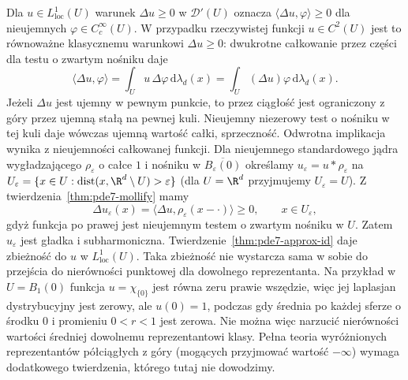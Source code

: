 \begin{uwaga}
Dla $u\in L^1_{\mathrm{loc}}(U)$ warunek
$\Delta u\ge0$ w $\mathcal D'(U)$ oznacza
$\langle\Delta u,\varphi\rangle\ge0$ dla nieujemnych
$\varphi\in C_c^\infty(U)$. W przypadku rzeczywistej
funkcji $u\in C^2(U)$ jest to równoważne klasycznemu
warunkowi $\Delta u\ge0$: dwukrotne całkowanie przez części
dla testu o zwartym nośniku daje
\[
 \langle\Delta u,\varphi\rangle
 =\int_U u\,\Delta\varphi\,\mathrm d\lambda_d(x)
 =\int_U (\Delta u)\varphi\,\mathrm d\lambda_d(x).
\]
Jeżeli $\Delta u$ jest ujemny w pewnym punkcie, to przez
ciągłość jest ograniczony z góry przez ujemną stałą na
pewnej kuli. Nieujemny niezerowy test o nośniku w tej
kuli daje wówczas ujemną wartość całki, sprzeczność.
Odwrotna implikacja wynika z nieujemności całkowanej
funkcji. Dla nieujemnego standardowego
jądra wygładzającego $\rho_\varepsilon$ o całce $1$
i nośniku w $\overline{B_\varepsilon(0)}$ określamy
$u_\varepsilon=u*\rho_\varepsilon$ na
$U_\varepsilon=\{x\in U:\operatorname{dist}(x,\R^d\setminus U)>
\varepsilon\}$ (dla $U=\R^d$ przyjmujemy $U_\varepsilon=U$).
Z twierdzenia~\ref{thm:pde7-mollify} mamy
\[
 \Delta u_\varepsilon(x)
 =\langle\Delta u,\rho_\varepsilon(x-\cdot)\rangle\ge0,
 \qquad x\in U_\varepsilon,
\]
gdyż funkcja po prawej jest nieujemnym testem o zwartym
nośniku w $U$. Zatem $u_\varepsilon$ jest gładka
i subharmoniczna. Twierdzenie~\ref{thm:pde7-approx-id}
daje zbieżność do $u$ w $L^1_{\mathrm{loc}}(U)$.
Taka zbieżność nie wystarcza sama w sobie do przejścia
do nierówności punktowej dla dowolnego reprezentanta.
Na przykład w $U=B_1(0)$ funkcja $u=\chi_{\{0\}}$
jest równa zeru prawie wszędzie, więc jej laplasjan
dystrybucyjny jest zerowy, ale $u(0)=1$, podczas gdy
średnia po każdej sferze o środku $0$ i promieniu
$0<r<1$ jest zerowa. Nie można więc narzucić nierówności
wartości średniej dowolnemu reprezentantowi klasy.
Pełna teoria wyróżnionych reprezentantów półciągłych
z góry (mogących przyjmować wartość $-\infty$)
wymaga dodatkowego twierdzenia, którego tutaj nie dowodzimy.
\end{uwaga}

